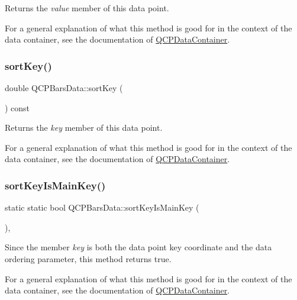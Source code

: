 Returns the {\itshape value} member of this data point.

For a general explanation of what this method is good for in the context of the data container, see the documentation of \hyperlink{class_q_c_p_data_container}{Q\+C\+P\+Data\+Container}. \mbox{\label{class_q_c_p_bars_data_a107d22d84f336bf6e3c3ad0133a5d2f6}} 
\subsubsection{\texorpdfstring{sort\+Key()}{sortKey()}}
{\footnotesize\ttfamily double Q\+C\+P\+Bars\+Data\+::sort\+Key (\begin{DoxyParamCaption}{ }\end{DoxyParamCaption}) const\hspace{0.3cm}{\ttfamily [inline]}}

Returns the {\itshape key} member of this data point.

For a general explanation of what this method is good for in the context of the data container, see the documentation of \hyperlink{class_q_c_p_data_container}{Q\+C\+P\+Data\+Container}. \mbox{\label{class_q_c_p_bars_data_aebaabda335bd4c9f81bd585d16b63aa8}} 
\subsubsection{\texorpdfstring{sort\+Key\+Is\+Main\+Key()}{sortKeyIsMainKey()}}
{\footnotesize\ttfamily static static bool Q\+C\+P\+Bars\+Data\+::sort\+Key\+Is\+Main\+Key (\begin{DoxyParamCaption}{ }\end{DoxyParamCaption})\hspace{0.3cm}{\ttfamily [inline]}, {\ttfamily [static]}}

Since the member {\itshape key} is both the data point key coordinate and the data ordering parameter, this method returns true.

For a general explanation of what this method is good for in the context of the data container, see the documentation of \hyperlink{class_q_c_p_data_container}{Q\+C\+P\+Data\+Container}. \mbox{\label{class_q_c_p_bars_data_acf3e6479dacacd6c81eebe7d4cd62185}} 
